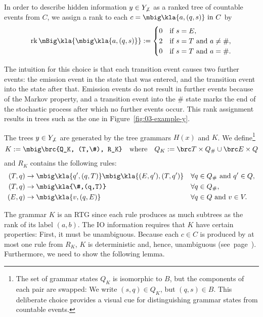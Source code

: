 In order to describe hidden information $y\in Y_{\not\bot}$ as a ranked tree of countable
events from $C$, we assign a rank to each $c = \mbig\kla{a,(q,s)}\isin C$ by
\begin{align*}
 \rk\mBig\kla{\mbig\kla{a,(q,s)}} := \begin{cases}
  0 & \text{if } s = E, \\
  2 & \text{if } s = T \text{ and } a\neq\#, \\
  0 & \text{if } s = T \text{ and } a = \#.
 \end{cases}
\end{align*}

The intuition for this choice is that each transition event causes two further
events: the emission event in the state that was entered, and the transition
event into the state after that. Emission events do not result in further
events because of the Markov property, and a transition event into the $\#$
state marks the end of the stochastic process after which no further events
occur. This rank assignment results in trees such as the one in
Figure~\ref{fig:03-example-y}.

The trees $y\in Y_{\not\bot}$ are generated by the tree grammars $H(x)$ and $K$. We
define\footnote{The set of grammar states $Q_K$ is isomorphic to $B$, but the
components of each pair are swapped: We write $(s,q)\in Q_K$, but $(q,s)\in B$.
This deliberate choice provides a visual cue for distinguishing grammar states
from countable events.}
\label{eq:03-K}\[
 K := \mbig\brc{Q_K, (T,\#), R_K} \quad\text{where}\quad Q_K := \brc T \times Q_\# \cup \brc E \times Q
\]
and $R_K$ contains the following rules:
\label{eq:03-R_K}\begin{align*}
 (T,q) &\to \mbig\kla{q',(q,T)}\mbig\kla{(E,q'),(T,q')} &&\forall q\in Q_\# \text{ and } q'\in Q, \\
 (T,q) &\to \mbig\kla{\#,(q,T)} &&\forall q\in Q_\#, \\
 (E,q) &\to \mbig\kla{v,(q,E)} &&\forall q\in Q \text{ and } v\in V.
\end{align*}

The grammar $K$ is an RTG since each rule produces as much subtrees as the rank
of its label $(a,b)$. The IO information requires that $K$ have certain
properties: First, it must be unambiguous. Because each $c\in C$ is produced by
at most one rule from $R_K$, $K$ is deterministic and, hence, unambiguous
(see~page~\pageref{lemma:02-deterministic-is-unambiguous}). Furthermore, we
need to show the following lemma.

